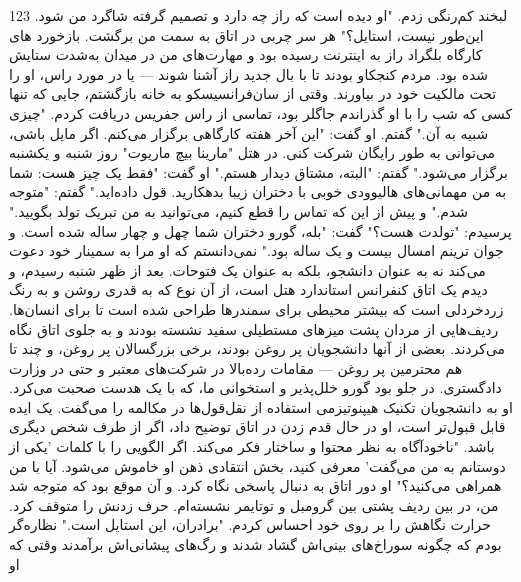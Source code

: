 123  
لبخند کم‌رنگی زدم. "او دیده است که راز چه دارد و تصمیم گرفته شاگرد من شود. این‌طور نیست، استایل؟"  
هر سر چربی در اتاق به سمت من برگشت. بازخورد های کارگاه بلگراد راز به اینترنت رسیده بود و مهارت‌های من در میدان به‌شدت ستایش شده بود. مردم کنجکاو بودند تا با بال جدید راز آشنا شوند — یا در مورد راس، او را تحت مالکیت خود در بیاورند.  
وقتی از سان‌فرانسیسکو به خانه بازگشتم، جایی که تنها کسی که شب را با او گذراندم جاگلر بود، تماسی از راس جفریس دریافت کردم. "چیزی شبیه به آن." گفتم.  
او گفت: "این آخر هفته کارگاهی برگزار می‌کنم. اگر مایل باشی، می‌توانی به طور رایگان شرکت کنی. در هتل "مارینا بیچ ماریوت" روز شنبه و یکشنبه برگزار می‌شود."  
گفتم: "البته، مشتاق دیدار هستم."  
او گفت: "فقط یک چیز هست: شما به من مهمانی‌های هالیوودی خوبی با دختران زیبا بدهکارید. قول داده‌اید."  
گفتم: "متوجه شدم."  
و پیش از این که تماس را قطع کنیم، می‌توانید به من تبریک تولد بگویید."  
پرسیدم: "تولدت هست؟"  
گفت: "بله، گورو دختران شما چهل و چهار ساله شده است. و جوان ترینم امسال بیست و یک ساله بود."  
نمی‌دانستم که او مرا به سمینار خود دعوت می‌کند نه به عنوان دانشجو، بلکه به عنوان یک فتوحات.  
بعد از ظهر شنبه رسیدم، و دیدم یک اتاق کنفرانس استاندارد هتل است، از آن نوع که به قدری روشن و به رنگ زردخردلی است که بیشتر محیطی برای سمندرها طراحی شده است تا برای انسان‌ها. ردیف‌هایی از مردان پشت میزهای مستطیلی سفید نشسته بودند و به جلوی اتاق نگاه می‌کردند. بعضی از آنها دانشجویان پر روغن بودند، برخی بزرگسالان پر روغن، و چند تا هم محترمین پر روغن — مقامات رده‌بالا در شرکت‌های معتبر و حتی در وزارت دادگستری. در جلو بود گورو خلل‌پذیر و استخوانی ما، که با یک هدست صحبت می‌کرد.  
او به دانشجویان تکنیک هیپنوتیزمی استفاده از نقل‌قول‌ها در مکالمه را می‌گفت. یک ایده قابل قبول‌تر است، او در حال قدم زدن در اتاق توضیح داد، اگر از طرف شخص دیگری باشد. "ناخودآگاه به نظر محتوا و ساختار فکر می‌کند. اگر الگویی را با کلمات 'یکی از دوستانم به من می‌گفت' معرفی کنید، بخش انتقادی ذهن او خاموش می‌شود. آیا با من همراهی می‌کنید؟"  
او دور اتاق به دنبال پاسخی نگاه کرد. و آن موقع بود که متوجه شد من، در بین ردیف پشتی بین گرومبل و توتایمر نشسته‌ام. حرف زدنش را متوقف کرد. حرارت نگاهش را بر روی خود احساس کردم. "برادران، این استایل است."  
نظاره‌گر بودم که چگونه سوراخ‌های بینی‌اش گشاد شدند و رگ‌های پیشانی‌اش برآمدند وقتی که او